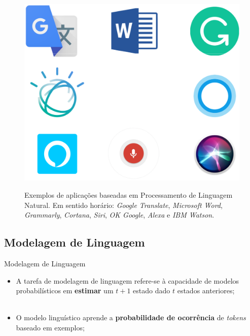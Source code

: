 \begin{frame}
	\begin{figure}[!ht]
		\centering
		\includegraphics[scale=0.4]{figs/nlp_applications.eps}	
		\label{f.nlp_applications}
		\caption{Exemplos de aplicações baseadas em Processamento de Linguagem Natural. Em sentido horário: \emph{Google Translate}, \emph{Microsoft Word}, \emph{Grammarly}, \emph{Cortana}, \emph{Siri}, \emph{OK Google}, \emph{Alexa} e \emph{IBM Watson}.}
	\end{figure}
\end{frame}

\subsection{Modelagem de Linguagem}
\label{ss.gln}

\begin{frame}{Modelagem de Linguagem}
	\begin{itemize}
		\justifying
		\item A tarefa de modelagem de linguagem refere-se à capacidade de modelos probabilísticos em \textbf{estimar} um $t+1$ estado dado $t$ estados anteriores;
		\\~\\
		\item O modelo linguístico aprende a \textbf{probabilidade de ocorrência} de \emph{tokens} baseado em exemplos;
	\end{itemize}
\end{frame}

